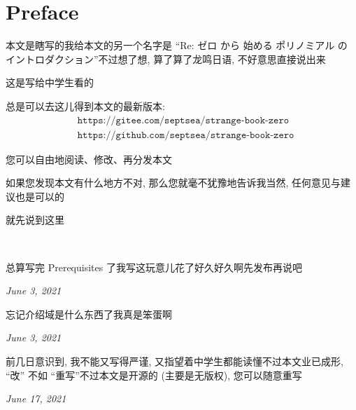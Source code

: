 \section*{Preface}

本文是瞎写的\period 我给本文的另一个名字是 ``Re: ゼロ から 始める ポリノミアル の イントロダクション''\period 不过想了想, 算了算了\period 龙鸣日语, 不好意思直接说出来\period

这是写给中学生看的\period

总是可以去这儿得到本文的最新版本:
\begin{align*}
     & \texttt{https://gitee.com/septsea/strange-book-zero}  \\
     & \texttt{https://github.com/septsea/strange-book-zero}
\end{align*}

您可以自由地阅读、修改、再分发本文\period

如果您发现本文有什么地方不对, 那么您就毫不犹豫地告诉我\period 当然, 任何意见与建议也是可以的\period

就先说到这里\period

\ \

\providecommand{\appendDate}{}
\renewcommand{\appendDate}[1]{\par \hfill {\itshape \sffamily #1}}

\begin{remark}
    总算写完 Prerequisites 了\period 我写这玩意儿花了好久好久啊\period 先发布再说吧\period
    \appendDate{June 3, 2021}
\end{remark}

\begin{remark}
    忘记介绍域是什么东西了\period 我真是笨蛋啊\period
    \appendDate{June 3, 2021}
\end{remark}

\begin{remark}
    前几日意识到, 我不能又写得严谨, 又指望着中学生都能读懂\period 不过本文业已成形, ``改'' 不如 ``重写''\period 不过本文是开源的 (主要是无版权), 您可以随意重写\period
    \appendDate{June 17, 2021}
\end{remark}
